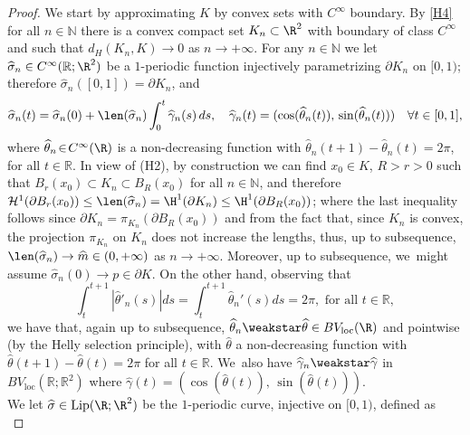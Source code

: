 \begin{proof}
We start by approximating $K$ by convex sets with $C^\infty$ boundary. By \ref{H4} for all $n\in\mathbb{N}$ there is a convex compact set $K_n\subset\R^2$ with boundary of class $C^\infty$ and such that
$d_H(K_n,K)\to0$ as $n\to +\infty$.
For any $n\in\mathbb{N}$ we let $\widehat\sigma_n\in C^\infty(\mathbb R;\R^2)$ be a $1$\nobreakdash-periodic function injectively parametrizing $\partial K_n$ on $[0,1)$; therefore $\widehat\sigma_n([0,1])=\partial K_n$, and
\begin{equation*}
\widehat \sigma_n(t)=\widehat \sigma_n(0)+\len(\widehat\sigma_n)\int_0^t\widehat\gamma_n(s)\,ds,\quad \widehat\gamma_n(t)=(\cos(\widehat\theta_n(t)),\,\sin(\widehat\theta_n(t)))
\quad \forall t\in [0,1],
\end{equation*}
where $\widehat \theta_n\!\in\! C^\infty(\R)$ is a non-decreasing function with $\widehat\theta_n(t+1)-\widehat\theta_n(t)\!=\!2\pi$, for all \hbox{$t\!\in\! \mathbb R$}.
In view of (H2), by construction we can find $x_0\in K$, $R>r>0$ such that $B_r(x_0)\subset K_n\subset B_R(x_0)$ for all $n\in \mathbb N$, and therefore
$\mathcal{H}^1(\partial B_r(x_0))\le \len(\widehat\sigma_n)=
\H^1(\mathcal \partial K_n)\le\H^1(\partial B_R(x_0))$; where the last inequality follows since $\partial K_n=\pi_{K_n}(\partial B_R(x_0))$ and from the fact that, since $K_n$ is convex, the projection $\pi_{K_n}$ on $K_n$ does not increase the lengths, thus, up to subsequence, $\len(\widehat\sigma_n)\to \widehat m\in(0,+\infty)$ as $n\to +\infty$. Moreover, up to subsequence, we~might assume $\widehat\sigma_n(0)\to p\in \partial K$.
On the other hand, observing that
\begin{equation*}
\int_t^{t+1}|\widehat\theta'_n(s)|ds=\int_t^{t+1}\widehat\theta_n'(s)ds=2\pi, \text{ for all }t\in \mathbb R,
\end{equation*}
we have that, again up to subsequence, $\widehat\theta_n\weakstar\widehat\theta\in BV_{\mathrm{loc}}(\R)$ and pointwise (by the Helly selection principle), with $\widehat\theta$ a non-decreasing function with $\widehat \theta(t+1)-\widehat \theta(t)=2\pi$ for all $t\in \mathbb R$. We~also have $\widehat \gamma_n\weakstar\widehat \gamma$ in $BV_{\mathrm{loc}}(\mathbb R;\mathbb R^2)$ where $\widehat \gamma(t)=(\cos(\widehat \theta(t)),\,\sin(\widehat \theta(t)))$.\\
We let $\widehat \sigma\in {\rm{Lip}}(\R;\R^2)$ be the $1$-periodic curve, injective on $[0,1)$, defined as
\begin{equation}\label{sigma_boundary}

\end{equation}
\end{proof}
